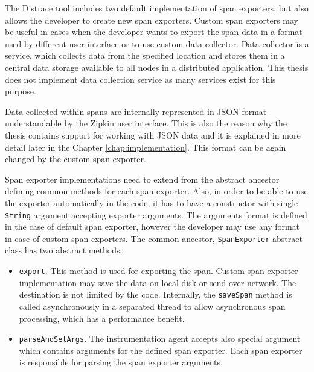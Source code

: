 The Distrace tool includes two default implementation of span exporters, but also allows the developer to create new span exporters. Custom span exporters may be useful in cases when the developer wants to export the span data in a format used by different user interface or to use custom data collector. Data collector is a service, which collects data from the specified location and stores them in a central data storage available to all nodes in a distributed application. This thesis does not implement data collection service as many services exist for this purpose. 

Data collected within spans are internally represented in JSON format understandable by the Zipkin user interface. This is also the reason why the thesis contains support for working with JSON data and it is explained in more detail later in the Chapter \ref{chap:implementation}. This format can be again changed by the custom span exporter.

Span exporter implementations need to extend from the abstract ancestor defining common methods for each span exporter. Also, in order to be able to use the exporter automatically in the code, it has to have a constructor with single \texttt{String} argument accepting exporter arguments. The arguments format is defined in the case of default span exporter, however the developer may use any format in case of custom span exporters. The common ancestor, \texttt{SpanExporter} abstract class has two abstract methods:
\begin{itemize}
	\item \texttt{export}. This method is used for exporting the span. Custom span exporter implementation may save the data on local disk or send over network. The destination is not limited by the code. Internally, the \texttt{saveSpan} method is called asynchronously in a separated thread to allow asynchronous span processing, which has a performance benefit.
	\item \texttt{parseAndSetArgs}. The instrumentation agent accepts also special argument which contains arguments for the defined span exporter. Each span exporter is responsible for parsing the span exporter arguments.
\end{itemize}

